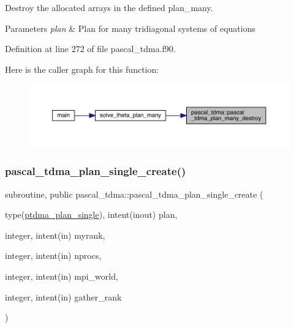 Destroy the allocated arrays in the defined plan\+\_\+many. 


\begin{DoxyParams}{Parameters}
{\em plan} & Plan for many tridiagonal systems of equations \\
\hline
\end{DoxyParams}


Definition at line 272 of file pascal\+\_\+tdma.\+f90.

Here is the caller graph for this function\+:
\nopagebreak
\begin{figure}[H]
\begin{center}
\leavevmode
\includegraphics[width=350pt]{namespacepascal__tdma_a8438e6774617871b147af9ec8bdad6ce_icgraph}
\end{center}
\end{figure}
\mbox{\label{namespacepascal__tdma_a5dfc2d7c919b47ad364a74d141532a9f}} 
\subsubsection{\texorpdfstring{pascal\_tdma\_plan\_single\_create()}{pascal\_tdma\_plan\_single\_create()}}
{\footnotesize\ttfamily subroutine, public pascal\+\_\+tdma\+::pascal\+\_\+tdma\+\_\+plan\+\_\+single\+\_\+create (\begin{DoxyParamCaption}\item[{type(\mbox{\hyperlink{structpascal__tdma_1_1ptdma__plan__single}{ptdma\+\_\+plan\+\_\+single}}), intent(inout)}]{plan,  }\item[{integer, intent(in)}]{myrank,  }\item[{integer, intent(in)}]{nprocs,  }\item[{integer, intent(in)}]{mpi\+\_\+world,  }\item[{integer, intent(in)}]{gather\+\_\+rank }\end{DoxyParamCaption})}



